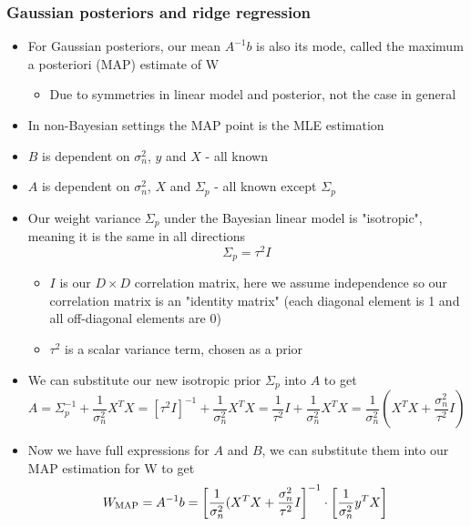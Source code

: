\documentclass[12pt]{article}
\begin{document}
\subsubsection{Gaussian posteriors and ridge regression}
\begin{itemize}
    \item For Gaussian posteriors, our mean $A^{-1}b$ is also its mode, called the maximum a posteriori (MAP) estimate of W
        \begin{itemize}
            \item Due to symmetries in linear model and posterior, not the case in general
        \end{itemize}
    \item In non-Bayesian settings the MAP point is the MLE estimation
    \item $B$ is dependent on $\sigma_n^2$, $y$ and $X$ - all known
    \item $A$ is dependent on $\sigma_n^2$, $X$ and $\Sigma_p$ - all known except $\Sigma_p$
    \item Our weight variance $\Sigma_p$ under the Bayesian linear model is "isotropic", meaning it is the same in all directions
\begin{equation}
    \Sigma_p = \tau^2 I
\end{equation}
    \begin{itemize}
        \item $I$ is our $D \times D$ correlation matrix, here we assume independence so our correlation matrix is an "identity matrix" (each diagonal element is 1 and all off-diagonal elements are 0)
        \item $\tau^2$ is a scalar variance term, chosen as a prior
    \end{itemize}
    \item We can substitute our new isotropic prior $\Sigma_p$ into $A$ to get
\begin{equation} 
    A = \Sigma_p^{-1} + \frac{1}{\sigma^2_n}X^TX = \left[{\tau^2}I\right]^{-1} + \frac{1}{\sigma^2_n}X^TX =  \frac{1}{\tau^2}I + \frac{1}{\sigma^2_n}X^TX = \frac{1}{\sigma_n^2}\left(X^TX + \frac{\sigma_n^2}{\tau^2}I\right)
\end{equation} 
    \item Now we have full expressions for $A$ and $B$, we can substitute them into our MAP estimation for W to get
\begin{equation} 
    W_{\text{MAP}} = A^{-1}b = \left[\frac{1}{\sigma_n^2}(X^TX + \frac{\sigma_n^2}{\tau^2}I\right]^{-1} \cdot \left[\frac{1}{\sigma_n^2}y^TX\right] \\

\end{equation}
\end{itemize}
\end{document}

